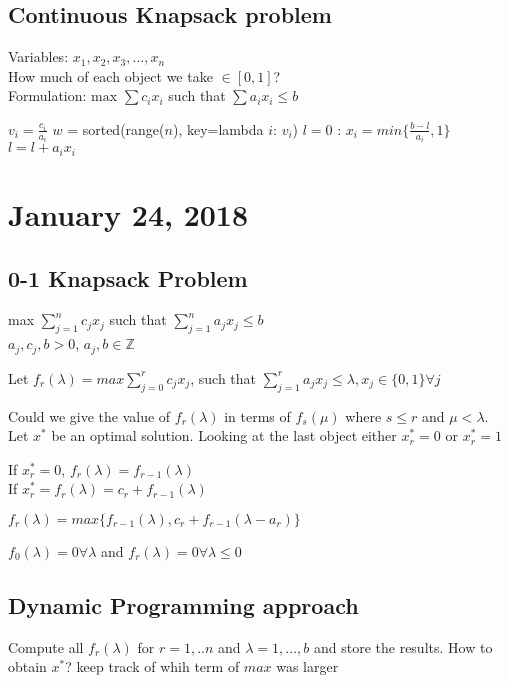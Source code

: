 \documentclass{article}
\theoremstyle{plain}
\theoremstyle{definition}
\begin{document}
\subsection{Continuous Knapsack problem}

Variables: $x_1, x_2, x_3, ..., x_n$\\
How much of each object we take $\in[0,1]$?\\
Formulation: $\text{max } \sum c_i x_i$ such that $\sum a_ix_i \leq b$

\begin{algorithmic}[1]
    \State $v_i = \frac{c_i}{a_i}$
    \State $w$ = sorted(range($n$), key=lambda $i$: $v_i$)
    \State $l = 0$
    :
        \State $x_i = min\{\frac{b-l}{a_i}, 1\}$
        \State $l = l + a_ix_i$
    \EndFor
\end{algorithmic}

\section{January 24, 2018}

\subsection{0-1 Knapsack Problem}
max $\sum^n_{j=1} c_j x_j$ such that $\sum_{j=1}^n a_jx_j \leq b$\\
$a_j, c_j, b > 0$, $a_j, b\in\mathbb{Z}$

Let $f_r(\lambda) = max \sum^r_{j=0} c_j x_j$,
such that $\sum^{r}_{j=1} a_jx_j \leq \lambda,
x_j\in \{0,1\} \forall j$

Could we give the value of $f_r(\lambda)$ in terms of $f_s(\mu)$ where
$s\leq r$ and $\mu < \lambda$. Let $x^*$ be an optimal solution. Looking
at the last object either $x^*_r = 0$ or $x^*_r = 1$

If $x^*_r  = 0$, $f_r(\lambda) = f_{r-1}(\lambda)$\\
If $x^*_r = f_r(\lambda) = c_r + f_{r-1}(\lambda)$

$f_r(\lambda) = max\{f_{r-1}(\lambda), c_r+f_{r-1}(\lambda - a_r)\}$

$f_0(\lambda) = 0 \forall \lambda$ and $f_r(\lambda) = 0 \forall \lambda \leq 0$

\subsection{Dynamic Programming approach}
Compute all $f_r(\lambda)$ for $r=1,..n$ and $\lambda = 1,...,b$ and store the results.
How to obtain $x^*$? keep track of whih term of $max{}$ was larger
\end{document}
